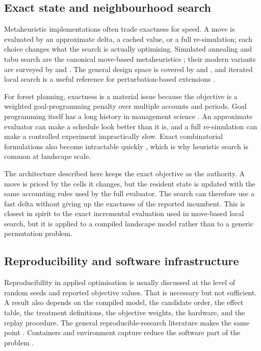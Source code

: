 \documentclass[11pt]{article}
\begin{document}
\subsection{Exact state and neighbourhood search}\label{exact-state-and-neighbourhood-search}

Metaheuristic implementations often trade exactness for speed. A move is evaluated by an approximate
delta, a cached value, or a full re-simulation; each choice changes what the search is actually
optimising. Simulated annealing and tabu search are the canonical move-based metaheuristics
\citep{kirkpatrick1983,glover1989}; their modern variants are surveyed by \citet{blum2003} and
\citet{boussaid2013}. The general design space is covered by \citet{hoos2004} and \citet{talbi2009},
and iterated local search is a useful reference for perturbation-based extensions
\citep{lourenco2003}.

For forest planning, exactness is a material issue because the objective is a weighted
goal-programming penalty over multiple accounts and periods. Goal programming itself has a long
history in management science \citep{charnes1961,ignizio1976,romero1991}. An approximate evaluator
can make a schedule look better than it is, and a full re-simulation can make a controlled experiment
impractically slow. Exact combinatorial formulations also become intractable quickly
\citep{garey1979,wolsey1998}, which is why heuristic search is common at landscape scale.

The architecture described here keeps the exact objective as the authority. A move is priced by the
cells it changes, but the resident state is updated with the same accounting rules used by the full
evaluator. The search can therefore use a fast delta without giving up the exactness of the reported
incumbent. This is closest in spirit to the exact incremental evaluation used in move-based local
search, but it is applied to a compiled landscape model rather than to a generic permutation
problem.

\subsection{Reproducibility and software infrastructure}\label{reproducibility-and-software-infrastructure}

Reproducibility in applied optimisation is usually discussed at the level of random seeds and reported
objective values. That is necessary but not sufficient. A result also depends on the compiled model,
the candidate order, the effect table, the treatment definitions, the objective weights, the hardware,
and the replay procedure. The general reproducible-research literature makes the same point
\citep{peng2011,sandve2013,wilson2014,stodden2016}. Containers and environment capture reduce the
software part of the problem \citep{boettiger2015,kurtzer2017}.
\end{document}
